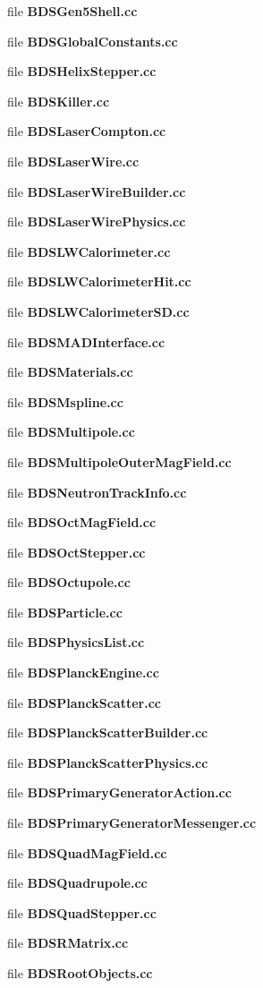 \begin{CompactItemize}
\item 
file {\bf BDSGen5Shell.cc}
\item 
file {\bf BDSGlobalConstants.cc}
\item 
file {\bf BDSHelixStepper.cc}
\item 
file {\bf BDSKiller.cc}
\item 
file {\bf BDSLaserCompton.cc}
\item 
file {\bf BDSLaserWire.cc}
\item 
file {\bf BDSLaserWireBuilder.cc}
\item 
file {\bf BDSLaserWirePhysics.cc}
\item 
file {\bf BDSLWCalorimeter.cc}
\item 
file {\bf BDSLWCalorimeterHit.cc}
\item 
file {\bf BDSLWCalorimeterSD.cc}
\item 
file {\bf BDSMADInterface.cc}
\item 
file {\bf BDSMaterials.cc}
\item 
file {\bf BDSMspline.cc}
\item 
file {\bf BDSMultipole.cc}
\item 
file {\bf BDSMultipoleOuterMagField.cc}
\item 
file {\bf BDSNeutronTrackInfo.cc}
\item 
file {\bf BDSOctMagField.cc}
\item 
file {\bf BDSOctStepper.cc}
\item 
file {\bf BDSOctupole.cc}
\item 
file {\bf BDSParticle.cc}
\item 
file {\bf BDSPhysicsList.cc}
\item 
file {\bf BDSPlanckEngine.cc}
\item 
file {\bf BDSPlanckScatter.cc}
\item 
file {\bf BDSPlanckScatterBuilder.cc}
\item 
file {\bf BDSPlanckScatterPhysics.cc}
\item 
file {\bf BDSPrimaryGeneratorAction.cc}
\item 
file {\bf BDSPrimaryGeneratorMessenger.cc}
\item 
file {\bf BDSQuadMagField.cc}
\item 
file {\bf BDSQuadrupole.cc}
\item 
file {\bf BDSQuadStepper.cc}
\item 
file {\bf BDSRMatrix.cc}
\item 
file {\bf BDSRootObjects.cc}
\item 

\end{CompactItemize}
